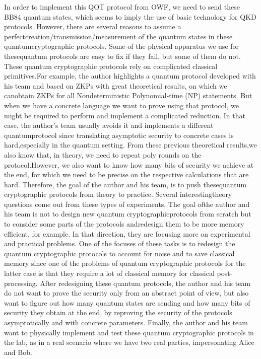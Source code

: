 \documentclass[12pt]{article}
\begin{document}
    In order to implement this QOT protocol from OWF, we need to send these BB84 quantum states, which seems to imply the use of basic technology for QKD protocols. However, there are several reasons to assume a perfect\break creation/transmission/measurement of the quantum states in these quantum\break cryptographic protocols. Some of the physical apparatus we use for these\break quantum protocols are easy to fix if they fail, but some of them do not. These quantum cryptographic protocols rely on complicated classical primitives.\break For example, the author highlights a quantum protocol developed with his team and based on ZKPs with great theoretical results, on which we can\break obtain ZKPs for all Nondeterministic Polynomial-time (NP) statements. But when we have a concrete language we want to prove using that protocol, we might be required to perform and implement a complicated reduction. In that case, the author's team usually avoids it and implements a different quantum\break protocol since translating asymptotic security to concrete cases is hard,\break especially in the quantum setting. From these previous theoretical results,\break we also know that, in theory, we need to repeat poly rounds on the protocol.\break However, we also want to know how many bits of security we achieve at the end, for which we need to be precise on the respective calculations that are hard. Therefore, the goal of the author and his team, is to push these\break quantum cryptographic protocols from theory to practice. Several interesting\break theory questions come out from these types of experiments. The goal of\break the author and his team is not to design new quantum cryptographic\break protocols from scratch but to consider some parts of the protocols and\break redesign them to be more memory efficient, for example. In that direction, they are focusing more on experimental and practical problems. One of the focuses of these tasks is to redesign the quantum cryptographic protocols to account for noise and to save classical memory since one of the problems of quantum cryptographic protocols for the latter case is that they require a lot of classical memory for classical post-processing. After redesigning these quantum protocols, the author and his team do not want to prove the security only from an abstract point of view, but also want to figure out how many quantum states are sending and how many bits of security they obtain at the end, by reproving the security of the protocols asymptotically and with concrete parameters. Finally, the author and his team want to physically implement and test these quantum cryptographic protocols in the lab, as in a real scenario where we have two real parties, impersonating Alice and Bob.
\end{document}
